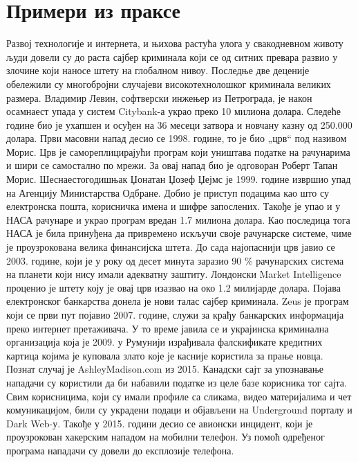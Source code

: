 \documentclass[a4paper]{article}
\begin{document}
	\section{Примери из праксе}
	\label{sec:Primeriizprakse}
	Развој технологије и интернета, и њихова растућа улога у свакодневном животу људи довели су до раста сајбер криминала који се од ситних превара развио у злочине који наносе штету на глобалном нивоу. Последње две деценије обележили су многобројни случајеви високотехнолошког криминала великих размера. \newline
	Владимир Левин, софтверски инжењер из Петрограда, је након осамнаест упада у систем Citybank-а украо преко 10 милиона долара. Следеће године био је ухапшен и осуђен на 36 месеци затвора и новчану казну од 250.000 долара. \newline
	Први масовни напад десио се 1998. године, то је био „црв“ под називом Морис. Црв је самореплицирајући програм који уништава податке на рачунарима и шири се самостално по мрежи. За овај напад био је одговоран Роберт Тапан Морис.\newline
	Шеснаестогодишњак Џонатан Џозеф Џејмс је 1999. године извршио упад на Агенцију Министарства Одбране. Добио је приступ подацима као што су електронска пошта, корисничка имена и шифре запослених. Такође је упао и у НАСА рачунаре и украо програм вредан 1.7 милиона долара. Као последица тога НАСА је била принуђена да привремено искључи своје рачунарске системе, чиме је проузрокована велика финансијска штета. \newline
	До сада најопаснији црв јавио се 2003. године, који је у року од десет минута заразио 90 \% рачунарских система на планети који нису имали адекватну заштиту. Лондонски Market Intelligence  проценио је штету коју је овај црв изазвао на око 1.2 милијарде долара. \newline
	Појава електронског банкарства донела је нови талас сајбер криминала. Zeus је програм који се први пут појавио 2007. године, служи за крађу банкарских информација преко интернет претаживача. У то време јавила се и украјинска криминална организација која је 2009. у Румунији израђивала фалскификате кредитних картица којима је куповала злато које је касније користила за прање новца. \newline
	Познат случај је AshleyMadison.com из 2015. Канадски сајт за упознавање нападачи су користили да би набавили податке из целе базе корисника тог сајта. Свим корисницима, који су имали профиле са сликама, видео материјалима и чет комуникацијом, били су украдени подаци и објављени на Underground порталу и Dark Web-у. \newline
	Такође у 2015. години десио се авионски инцидент, који је проузрокован хакерским нападом на мобилни телефон. Уз помоћ одређеног програма нападачи су довели до експлозије телефона. \newline
	
\end{document}
